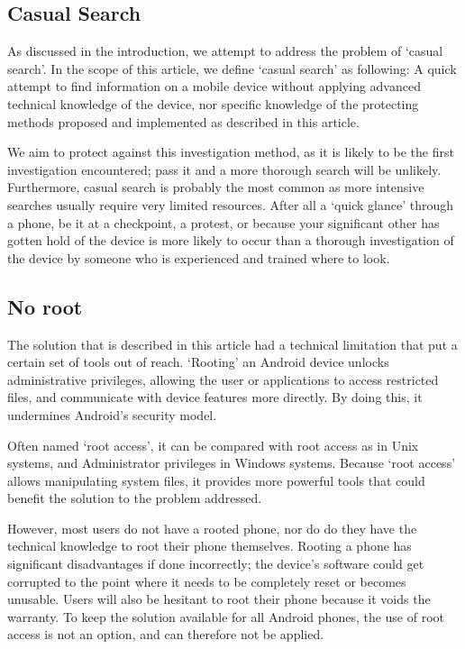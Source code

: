 \subsection{Casual Search}
As discussed in the introduction, we attempt to address the problem of `casual search'.
In the scope of this article, we define `casual search' as following: A quick attempt to find information on a mobile device without applying advanced technical knowledge of the device, nor specific knowledge of the protecting methods proposed and implemented as described in this article.

We aim to protect against this investigation method, as it is likely to be the first investigation encountered; pass it and a more thorough search will be unlikely.
Furthermore, casual search is probably the most common as more intensive searches usually require very limited resources.
After all a `quick glance' through a phone, be it at a checkpoint, a protest, or because your significant other has gotten hold of the device is more likely to occur than a thorough investigation of the device by someone who is experienced and trained where to look.

\subsection{No root}
The solution that is described in this article had a technical limitation that put a certain set of tools out of reach.
`Rooting' an Android device unlocks administrative privileges, allowing the user or applications to access restricted files, and communicate with device features more directly.
By doing this, it undermines Android's security model\cite{vidas2011all}.

Often named `root access', it can be compared with root access as in Unix systems, and Administrator privileges in Windows systems.
Because `root access' allows manipulating system files, it provides more powerful tools that could benefit the solution to the problem addressed.

However, most users do not have a rooted phone, nor do do they have the technical knowledge to root their phone themselves. 
Rooting a phone has significant disadvantages if done incorrectly; the device's software could get corrupted to the point where it needs to be completely reset or becomes unusable.
Users will also be hesitant to root their phone because it voids the warranty.
To keep the solution available for all Android phones, the use of root access is not an option, and can therefore not be applied.

